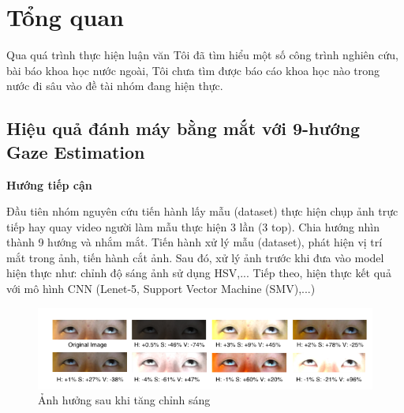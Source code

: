 \chapter{Tổng quan}


Qua quá trình thực hiện luận văn Tôi đã tìm hiểu một số công trình nghiên cứu, bài báo khoa học nước ngoài, Tôi chưa tìm được báo cáo khoa học nào trong nước đi sâu vào đề tài nhóm đang hiện thực.

\section{Hiệu quả đánh máy bằng mắt với 9-hướng Gaze Estimation
 \cite{9direction}}
\textbf{Hướng tiếp cận}

Đầu tiên nhóm nguyên cứu tiến hành lấy mẫu (dataset) thực hiện chụp ảnh trực tiếp hay quay video người làm mẫu thực hiện 3 lần (3 top). Chia hướng nhìn thành 9 hướng và nhắm mắt. Tiến hành xử lý mẫu (dataset), phát hiện vị trí mắt trong ảnh, tiến hành cắt ảnh. Sau đó, xử lý ảnh trước khi đưa vào model hiện thực như: chỉnh độ sáng ảnh sử dụng HSV,... Tiếp theo, hiện thực kết quả với mô hình CNN (Lenet-5, Support Vector Machine (SMV),...)

\begin{center}
    \begin{figure}[h!]
    \begin{center}
     \includegraphics[scale=0.5]{img/yey.png}
    \end{center}
    \caption{Ảnh hưởng sau khi tăng chỉnh sáng}
    \label{refhinh15}
    \end{figure}
\end{center}

